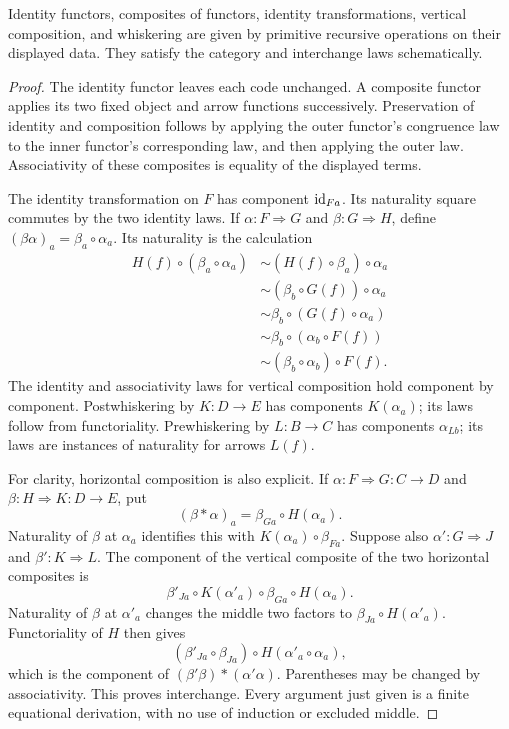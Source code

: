 \begin{proposition}
Identity functors, composites of functors, identity transformations, vertical
composition, and whiskering are given by primitive recursive operations on
their displayed data.  They satisfy the category and interchange laws
schematically.
\end{proposition}
\begin{proof}
The identity functor leaves each code unchanged.  A composite functor applies
its two fixed object and arrow functions successively.  Preservation of
identity and composition follows by applying the outer functor's congruence
law to the inner functor's corresponding law, and then applying the outer
law.  Associativity of these composites is equality of the displayed terms.

The identity transformation on $F$ has component $\operatorname{id}_{Fa}$.  Its naturality
square commutes by the two identity laws.  If $\alpha:F\Rightarrow G$ and
$\beta:G\Rightarrow H$, define
$(\beta\alpha)_a=\beta_a\circ\alpha_a$.  Its naturality is the calculation
\[
\begin{split}
 H(f)\circ(\beta_a\circ\alpha_a)
 &\sim (H(f)\circ\beta_a)\circ\alpha_a\\
 &\sim (\beta_b\circ G(f))\circ\alpha_a\\
 &\sim\beta_b\circ(G(f)\circ\alpha_a)\\
 &\sim\beta_b\circ(\alpha_b\circ F(f))\\
 &\sim(\beta_b\circ\alpha_b)\circ F(f).
\end{split}
\]
The identity and associativity laws for vertical composition hold component
by component.  Postwhiskering by $K:D\to E$ has components $K(\alpha_a)$;
its laws follow from functoriality.  Prewhiskering by $L:B\to C$ has components
$\alpha_{L b}$; its laws are instances of naturality for arrows $L(f)$.

For clarity, horizontal composition is also explicit.  If
$\alpha:F\Rightarrow G:C\to D$ and $\beta:H\Rightarrow K:D\to E$, put
\[
 (\beta*\alpha)_a=\beta_{Ga}\circ H(\alpha_a).
\]
Naturality of $\beta$ at $\alpha_a$ identifies this with
$K(\alpha_a)\circ\beta_{Fa}$.  Suppose also
$\alpha':G\Rightarrow J$ and $\beta':K\Rightarrow L$.  The component of the
vertical composite of the two horizontal composites is
\[
 \beta'_{Ja}\circ K(\alpha'_a)\circ\beta_{Ga}\circ H(\alpha_a).
\]
Naturality of $\beta$ at $\alpha'_a$ changes the middle two factors to
$\beta_{Ja}\circ H(\alpha'_a)$.  Functoriality of $H$ then gives
\[
 (\beta'_{Ja}\circ\beta_{Ja})\circ H(\alpha'_a\circ\alpha_a),
\]
which is the component of $(\beta'\beta)*(\alpha'\alpha)$.  Parentheses may
be changed by associativity.  This proves interchange.  Every argument just
given is a finite equational derivation, with no use of induction or excluded
middle.
\end{proof}

